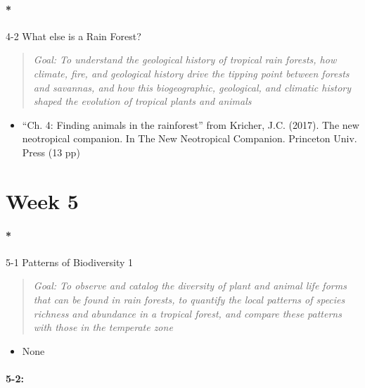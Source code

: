 \documentclass[
  10pt,
  letterpaper,
  oneside,
  open=any]{scrbook}
\let\oldparagraph\paragraph
\renewcommand{\paragraph}[1]{\oldparagraph{#1}\mbox{}}
\providecommand{\tightlist}{%
  \setlength{\itemsep}{0pt}\setlength{\parskip}{0pt}}\usepackage{longtable,booktabs,array}
\begin{document}
\paragraph*{4-2 What else is a Rain
Forest?}\label{what-else-is-a-rain-forest}

\begin{quote}
\emph{Goal: To understand the geological history of tropical rain
forests, how climate, fire, and geological history drive the tipping
point between forests and savannas, and how this biogeographic,
geological, and climatic history shaped the evolution of tropical plants
and animals}
\end{quote}

\begin{itemize}
\tightlist
\item
  ``Ch. 4: Finding animals in the rainforest'' from Kricher, J.C.
  (2017). The new neotropical companion. In The New Neotropical
  Companion. Princeton Univ. Press (13 pp)
\end{itemize}

\section*{Week 5}\label{week-5}


\paragraph*{5-1 Patterns of Biodiversity
1}\label{patterns-of-biodiversity-1}

\begin{quote}
\emph{Goal: To observe and catalog the diversity of plant and animal
life forms that can be found in rain forests, to quantify the local
patterns of species richness and abundance in a tropical forest, and
compare these patterns with those in the temperate zone}
\end{quote}

\begin{itemize}
\tightlist
\item
  None
\end{itemize}

\paragraph{5-2:}\label{section}
\end{document}
